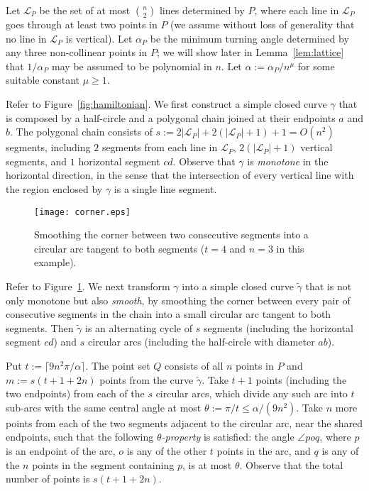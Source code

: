 \documentclass[letterpaper,11pt]{article}
\def\L{{\mathcal L}}
\begin{document}
Let $\L_P$ be the set of at most $n \choose 2$ lines determined by $P$,
where each line in $\L_P$ goes through at least two points in $P$
(we assume without loss of generality that no line in $\L_P$ is vertical).
Let $\alpha_P$ be the minimum turning angle determined
by any three non-collinear points in $P$;
we will show later in Lemma~\ref{lem:lattice}
that $1/\alpha_P$ may be assumed to be polynomial in $n$.
Let $\alpha := \alpha_P/n^\mu$ for some suitable constant $\mu \ge 1$.

Refer to Figure~\ref{fig:hamiltonian}.
We first construct a simple closed curve $\gamma$ that is composed by
a half-circle and a polygonal chain
joined at their endpoints $a$ and $b$.
The polygonal chain consists of
$s := 2|\L_P| + 2 (|\L_P| + 1) + 1 = O(n^2)$
segments, including $2$ segments from each line in $\L_P$,
$2(|\L_P| + 1)$ vertical segments, and $1$ horizontal segment $cd$.
Observe that $\gamma$ is \emph{monotone} in the horizontal direction,
in the sense that the intersection of every vertical line
with the region enclosed by $\gamma$ is a single line segment.

\begin{figure}[htb]
\centering\texttt{[image: corner.eps]}
\caption{Smoothing the corner between two consecutive segments
into a circular arc tangent to both segments
($t = 4$ and $n = 3$ in this example).}
\label{fig:corner}
\end{figure}

Refer to Figure~\ref{fig:corner}.
We next transform $\gamma$ into a simple closed curve $\tilde\gamma$
that is not only monotone but also \emph{smooth},
by smoothing the corner between every pair of consecutive segments
in the chain into a small circular arc tangent to both segments.
Then $\tilde\gamma$ is an alternating cycle of $s$ segments
(including the horizontal segment $cd$)
and $s$ circular arcs
(including the half-circle with diameter $ab$).

Put $t := \lceil 9n^2 \pi/\alpha \rceil$.
The point set $Q$ consists of all $n$ points in $P$
and $m := s(t+1+2n)$ points from the curve $\tilde\gamma$.
Take $t+1$ points (including the two endpoints)
from each of the $s$ circular arcs,
which divide any such arc into $t$ sub-arcs with the same central angle
at most $\theta := \pi/t \le \alpha / (9n^2)$.
Take $n$ more points from each of the two segments adjacent
to the circular arc, near the shared endpoints, such that
the following \emph{$\theta$-property} is satisfied:
the angle $\angle poq$,
where $p$ is an endpoint of the arc,
$o$ is any of the other $t$ points in the arc,
and $q$ is any of the $n$ points in the segment containing $p$,
is at most $\theta$.
Observe that the total number of points is $s(t+1+2n)$. 
\end{document}
